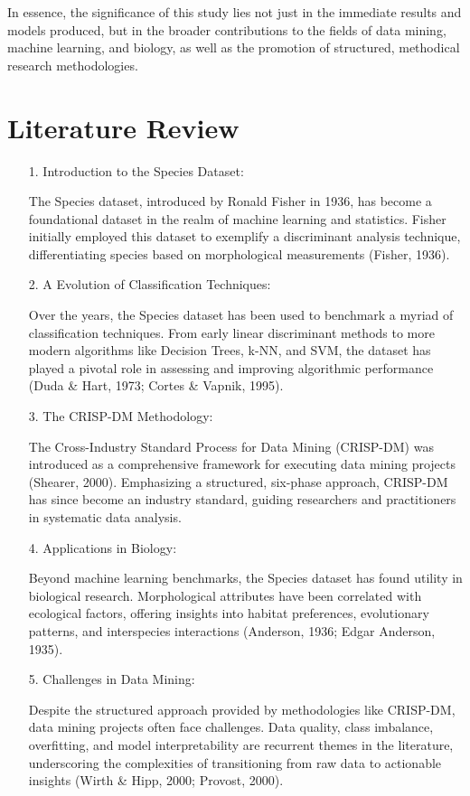 \documentclass{article}
\begin{document}
In essence, the significance of this study lies not just in the immediate results and models produced, but in the broader contributions to the fields of data mining, machine learning, and biology, as well as the promotion of structured, methodical research methodologies.

\section*{Literature Review}
\begin{itemize}
    \item[1.] Introduction to the Species Dataset:
    
The Species dataset, introduced by Ronald Fisher in 1936, has become a foundational dataset in the realm of machine learning and statistics. Fisher initially employed this dataset to exemplify a discriminant analysis technique, differentiating species based on morphological measurements (Fisher, 1936).
    \item[2.]A Evolution of Classification Techniques:
    
Over the years, the Species dataset has been used to benchmark a myriad of classification techniques. From early linear discriminant methods to more modern algorithms like Decision Trees, k-NN, and SVM, the dataset has played a pivotal role in assessing and improving algorithmic performance (Duda & Hart, 1973; Cortes & Vapnik, 1995).
    \item[3.]The CRISP-DM Methodology:
    
The Cross-Industry Standard Process for Data Mining (CRISP-DM) was introduced as a comprehensive framework for executing data mining projects (Shearer, 2000). Emphasizing a structured, six-phase approach, CRISP-DM has since become an industry standard, guiding researchers and practitioners in systematic data analysis.
    \item[4.]Applications in Biology:
    
Beyond machine learning benchmarks, the Species dataset has found utility in biological research. Morphological attributes have been correlated with ecological factors, offering insights into habitat preferences, evolutionary patterns, and interspecies interactions (Anderson, 1936; Edgar Anderson, 1935).
\item[5.] Challenges in Data Mining:

Despite the structured approach provided by methodologies like CRISP-DM, data mining projects often face challenges. Data quality, class imbalance, overfitting, and model interpretability are recurrent themes in the literature, underscoring the complexities of transitioning from raw data to actionable insights (Wirth & Hipp, 2000; Provost, 2000).


\end{itemize}
\end{document}

